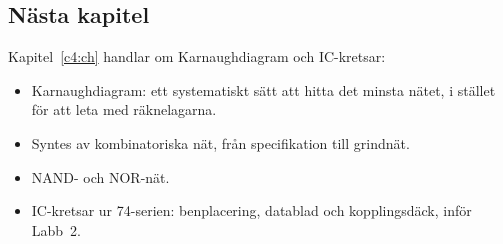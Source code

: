 \subsection*{Nästa kapitel}
Kapitel~\ref{c4:ch} handlar om Karnaughdiagram och IC-kretsar:
\begin{itemize}
  \item Karnaughdiagram: ett systematiskt sätt att hitta det minsta nätet, i stället för att leta
    med räknelagarna.
  \item Syntes av kombinatoriska nät, från specifikation till grindnät.
  \item NAND- och NOR-nät.
  \item IC-kretsar ur 74-serien: benplacering, datablad och kopplingsdäck, inför Labb~2.
\end{itemize}
